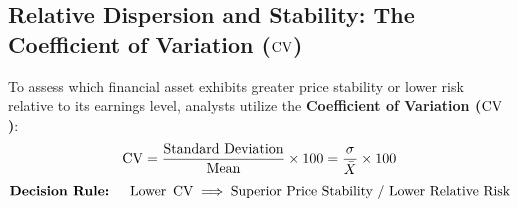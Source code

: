 \subsection{Relative Dispersion and Stability: The Coefficient of Variation (\texorpdfstring{$\operatorname{CV}$}{CV})}
To assess which financial asset exhibits greater price stability or lower risk relative to its earnings level, analysts utilize the \textbf{Coefficient of Variation ($\operatorname{CV}$)}:
\begin{equation}
    \operatorname{CV} = \frac{\text{Standard Deviation}}{\text{Mean}} \times 100 = \frac{\sigma}{\bar{X}} \times 100
\end{equation}
\begin{equation*}
    \textbf{Decision Rule: } \quad \text{Lower } \operatorname{CV} \implies \text{Superior Price Stability / Lower Relative Risk}
\end{equation*}

